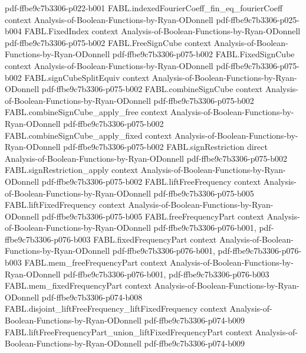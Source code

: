 \begin{theorem}
  {pdf-ffbe9c7b3306-p022-b001}
\proofstep
  {FABL.indexedFourierCoeff_fin_eq_fourierCoeff}
  {context}
  {Analysis-of-Boolean-Functions-by-Ryan-ODonnell}
  {pdf-ffbe9c7b3306-p025-b004}
\proofstep
  {FABL.FixedIndex}
  {context}
  {Analysis-of-Boolean-Functions-by-Ryan-ODonnell}
  {pdf-ffbe9c7b3306-p075-b002}
\proofstep
  {FABL.FreeSignCube}
  {context}
  {Analysis-of-Boolean-Functions-by-Ryan-ODonnell}
  {pdf-ffbe9c7b3306-p075-b002}
\proofstep
  {FABL.FixedSignCube}
  {context}
  {Analysis-of-Boolean-Functions-by-Ryan-ODonnell}
  {pdf-ffbe9c7b3306-p075-b002}
\proofstep
  {FABL.signCubeSplitEquiv}
  {context}
  {Analysis-of-Boolean-Functions-by-Ryan-ODonnell}
  {pdf-ffbe9c7b3306-p075-b002}
\proofstep
  {FABL.combineSignCube}
  {context}
  {Analysis-of-Boolean-Functions-by-Ryan-ODonnell}
  {pdf-ffbe9c7b3306-p075-b002}
\proofstep
  {FABL.combineSignCube_apply_free}
  {context}
  {Analysis-of-Boolean-Functions-by-Ryan-ODonnell}
  {pdf-ffbe9c7b3306-p075-b002}
\proofstep
  {FABL.combineSignCube_apply_fixed}
  {context}
  {Analysis-of-Boolean-Functions-by-Ryan-ODonnell}
  {pdf-ffbe9c7b3306-p075-b002}
\proofstep
  {FABL.signRestriction}
  {direct}
  {Analysis-of-Boolean-Functions-by-Ryan-ODonnell}
  {pdf-ffbe9c7b3306-p075-b002}
\proofstep
  {FABL.signRestriction_apply}
  {context}
  {Analysis-of-Boolean-Functions-by-Ryan-ODonnell}
  {pdf-ffbe9c7b3306-p075-b002}
\proofstep
  {FABL.liftFreeFrequency}
  {context}
  {Analysis-of-Boolean-Functions-by-Ryan-ODonnell}
  {pdf-ffbe9c7b3306-p075-b005}
\proofstep
  {FABL.liftFixedFrequency}
  {context}
  {Analysis-of-Boolean-Functions-by-Ryan-ODonnell}
  {pdf-ffbe9c7b3306-p075-b005}
\proofstep
  {FABL.freeFrequencyPart}
  {context}
  {Analysis-of-Boolean-Functions-by-Ryan-ODonnell}
  {pdf-ffbe9c7b3306-p076-b001,
    pdf-ffbe9c7b3306-p076-b003}
\proofstep
  {FABL.fixedFrequencyPart}
  {context}
  {Analysis-of-Boolean-Functions-by-Ryan-ODonnell}
  {pdf-ffbe9c7b3306-p076-b001,
    pdf-ffbe9c7b3306-p076-b003}
\proofstep
  {FABL.mem_freeFrequencyPart}
  {context}
  {Analysis-of-Boolean-Functions-by-Ryan-ODonnell}
  {pdf-ffbe9c7b3306-p076-b001,
    pdf-ffbe9c7b3306-p076-b003}
\proofstep
  {FABL.mem_fixedFrequencyPart}
  {context}
  {Analysis-of-Boolean-Functions-by-Ryan-ODonnell}
  {pdf-ffbe9c7b3306-p074-b008}
\proofstep
  {FABL.disjoint_liftFreeFrequency_liftFixedFrequency}
  {context}
  {Analysis-of-Boolean-Functions-by-Ryan-ODonnell}
  {pdf-ffbe9c7b3306-p074-b009}
\proofstep
  {FABL.liftFreeFrequencyPart_union_liftFixedFrequencyPart}
  {context}
  {Analysis-of-Boolean-Functions-by-Ryan-ODonnell}
  {pdf-ffbe9c7b3306-p074-b009}

\end{theorem}
